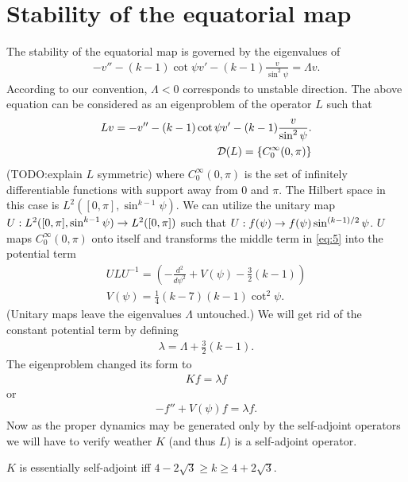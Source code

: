 \section*{Stability of the equatorial map}

The stability of the equatorial map is governed by the eigenvalues of
\begin{align}
  \label{eq:4}
  -v''-(k-1)\cot\psi v'-(k-1)\frac{v}{\sin^2\psi}=\Lambda v.
\end{align}
According to our convention, $\Lambda<0$ corresponds to unstable
direction. The above equation can be considered as an eigenproblem of
the operator $L$ such that
\begin{align}
  \label{eq:5}
  Lv=-v''-(k-1)\cot\psi v'-(k-1)\frac{v}{\sin^2\psi}.\\
  \mathcal{D}(L)=\{C^\infty_0(0,\pi)\}
\end{align}
(TODO:explain $L$ symmetric) where $C^\infty_0(0,\pi)$ is the set of
infinitely differentiable functions with support away from $0$ and
$\pi$. The Hilbert space in this case is
$L^2([0,\pi],\sin^{k-1}\psi)$. We can utilize the unitary map
$U:L^2([0,\pi],\sin^{k-1}\psi)\rightarrow L^2([0,\pi])$ such that
$U:f(\psi)\rightarrow f(\psi)\sin^{(k-1)/2}\psi$. $U$ maps $C_0^\infty(0,\pi)$
onto itself and transforms the middle term in \eqref{eq:5} into the
potential term
\begin{align}
  \label{eq:7}
  ULU^{-1}=\left(
    -\frac{d^2}{d\psi^2}+V(\psi)-\frac{3}{2}(k-1)\right)\\
  V(\psi)=\frac{1}{4}(k-7)(k-1)\cot^2\psi.
\end{align}
(Unitary maps leave the eigenvalues $\Lambda$ untouched.) We will get
rid of the constant potential term by defining
\begin{align}
  \label{eq:8}
  \lambda=\Lambda+\frac{3}{2}(k-1).
\end{align}
The eigenproblem changed its form to
\begin{align}
  \label{eq:9}
  Kf=\lambda f
\end{align}
or
\begin{align}
  \label{eq:15}
  -f''+V(\psi)f=\lambda f.
\end{align}
Now as the proper dynamics may be generated only by the self-adjoint
operators we will have to verify weather $K$ (and thus $L$) is a
self-adjoint operator.
\begin{theorem}
  $K$ is essentially self-adjoint iff $4-2\sqrt{3}\ge
  k\ge4+2\sqrt{3}$.
\end{theorem}

